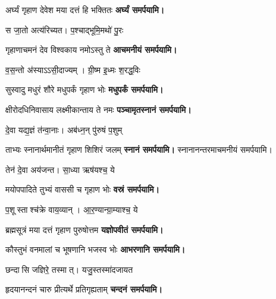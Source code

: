 \begin{center}
{अर्घ्यं गृहाण देवेश मया दत्तं हि भक्तितः}
\textbf{\devAya{} अर्घ्यं समर्पयामि।}

{स जा॒तो अत्य॑रिच्यत। प॒श्चाद्भूमि॒मथो॑ पु॒रः}

{गृहाणाचमनं देव विश्वकाय नमोऽस्तु ते}
\textbf{\devAya{} आचमनीयं समर्पयामि।}
\medskip


{व॒स॒न्तो अ॑स्याऽऽसी॒दाज्यम्। ग्री॒ष्म इ॒ध्मः श॒रद्ध॒विः}

{सुस्वादु मधुरं शौरे मधुपर्कं गृहाण भोः}
\textbf{\devAya{} मधुपर्कं समर्पयामि।}
\medskip


{क्षीरोदधिनिवासाय लक्ष्मीकान्ताय ते नमः}
\textbf{\devAya{} पञ्चामृतस्नानं समर्पयामि।}
\medskip

{दे॒वा यद्य॒ज्ञं त॑न्वा॒नाः। अब॑ध्न॒न् पु॑रुषं प॒शुम्}

{ताभ्यः स्नानार्थमानीतं गृहाण शिशिरं जलम्}
\textbf{\devAya{} स्नानं समर्पयामि।}
स्नानानन्तरमाचमनीयं समर्पयामि।
\medskip

{तेन॑ दे॒वा अय॑जन्त। सा॒ध्या ऋष॑यश्च॒ ये}

{मयोपपादिते तुभ्यं वाससी च गृहाण भोः}
\textbf{\devAya{} वस्रं समर्पयामि।}
\medskip

{प॒शूस्ताश्च॑क्रे वाय॒व्यान्। आ॒र॒ण्यान्ग्रा॒म्याश्च॒ ये}

{ब्रह्मसूत्रं मया दत्तं गृहाण पुरुषोत्तम}
\textbf{\devAya{} यज्ञोपवीतं समर्पयामि। }
\medskip

{कौस्तुभं वनमालां च भूषणानि भजस्व भोः}
\textbf{\devAya{} आभरणानि समर्पयामि।} 
\medskip

{छन्दासि जज्ञिरे॒ तस्मात्। यजु॒स्तस्मा॑दजायत}

{हृदयानन्दनं चारु प्रीत्यर्थे प्रतिगृह्यताम्}
\textbf{\devAya{} चन्दनं समर्पयामि।}
\medskip


\end{center}
